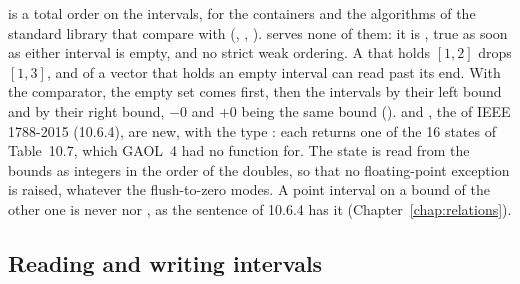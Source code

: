 \medskip
{} is a total order on the intervals, for the
containers and the algorithms of the standard library that compare with
\code{<} (, , ).\newinvfive{}
\code{<} serves none of them: it is , true as soon as
either interval is empty, and no strict weak ordering. A
 that holds $[1, 2]$ drops $[1, 3]$, and
 of a vector that holds an empty interval can read past its
end. With the comparator, the empty set comes first, then the intervals by
their left bound and by their right bound, $-0$ and $+0$ being the same bound
().  and , the
 of IEEE 1788-2015 (10.6.4), are new, with the type : each returns one of
the 16 states of Table~10.7, which GAOL~4 had no function for. The state is
read from the bounds as integers in the order of the doubles, so that no
floating-point exception is raised, whatever the flush-to-zero modes. A point
interval on a bound of the other one is never  nor
, as the sentence of 10.6.4 has it
(Chapter~\ref{chap:relations}).

\subsection{Reading and writing intervals}
\label{sec:changes-io}
%
%

